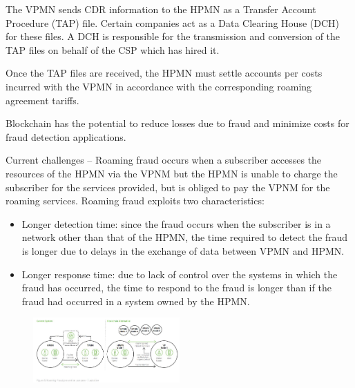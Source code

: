 \documentclass[12pt]{article}
\begin{document}
The VPMN sends CDR information to the
HPMN as a Transfer Account Procedure
(TAP) file. Certain companies act as a Data
Clearing House (DCH) for these files. A DCH
is responsible for the transmission and
conversion of the TAP files on behalf of the
CSP which has hired it.

Once the TAP files are received, the HPMN
must settle accounts per costs incurred with the VPMN in accordance with the corresponding roaming agreement tariffs.

\leftboxbegin
Blockchain has the
potential to reduce losses
due to fraud and minimize
costs for fraud detection
applications.
\leftboxend

Current challenges – Roaming fraud occurs
when a subscriber accesses the resources
of the HPMN via the VPNM but the HPMN
is unable to charge the subscriber for the
services provided, but is obliged to pay the
VPNM for the roaming services. Roaming
fraud exploits two characteristics:
\begin{itemize}
	\item Longer detection time: since the fraud occurs
	when the subscriber is in a network
	other than that of the HPMN, the time
	required to detect the fraud is longer
	due to delays in the exchange of data
	between VPMN and HPMN.
	\item Longer response time: due to lack of control over the systems in which the fraud
	has occurred, the time to respond to the
	fraud is longer than if the fraud had occurred
	in a system owned by the HPMN.
\end{itemize}

\begin{figure}[!h]
\centering
\includegraphics[width=0.5\textwidth]{fig5.jpg}
\end{figure}
\end{document}
